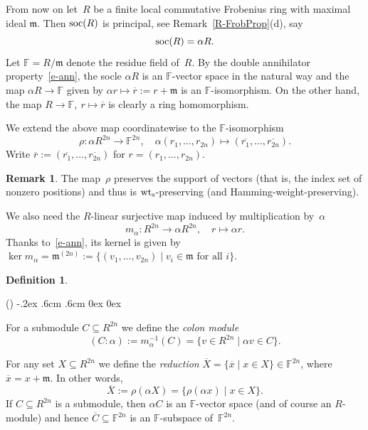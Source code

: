 \documentclass[11pt]{article}
\theoremstyle{definition}
\newtheorem{defi}[theo]{Definition}
\newtheorem{rem}[theo]{Remark}
\numberwithin{equation}{section}
\newcommand{\F}{{\mathbb F}}
\newcommand{\mm}{{\mathfrak m}}
\newcommand{\soc}{\mbox{\rm soc}}
\newcommand{\wts}{\mbox{${\rm wt}_{\rm s}$}}
\newcommand{\ov}[1]{\mbox{$\overline{#1}$}}
\newcounter{alp}
\newcounter{rom}
\newenvironment{alphalist}{\begin{list}{(\alph{alp})\hfill}{\usecounter{alp}
     \topsep-.2ex \labelwidth.6cm \leftmargin.6cm \labelsep0cm
     \rightmargin0cm \parsep0ex \itemsep0ex}}{\end{list}}
\begin{document}
From now on let~$R$ be a finite local commutative Frobenius ring with maximal ideal $\mm$.
Then $\soc(R)$ is principal, see Remark~\ref{R-FrobProp}(d), say
\begin{equation}\label{e-soc}
   \soc(R)=\alpha R.
\end{equation}
Let $\F=R/\mm$ denote the residue field of~$R$.
By the double annihilator property~\eqref{e-ann}, the socle $\alpha R$ is an $\F$-vector space in the natural way and the map
$\alpha R\longrightarrow\F$ given by $\alpha r\longmapsto \ov{r}:=r+\mm$ is an $\F$-isomorphism.
On the other hand, the map $R\longrightarrow\F,\ r\longmapsto\ov{r}$ is clearly a ring homomorphism.

We extend the above map coordinatewise to the $\F$-isomorphism
\begin{equation}\label{e-rho}
  \rho:\alpha R^{2n}\longrightarrow\F^{2n},\quad \alpha(r_1,\ldots,r_{2n})\longmapsto (\ov{r_1},\ldots,\ov{r_{2n}}).
\end{equation}
Write $\ov{r}:= (\ov{r_1},\ldots,\ov{r_{2n}})$ for $r=(r_1,\ldots,r_{2n})$.

\begin{rem}\label{R-rhopreserve}
The map~$\rho$  preserves the support of  vectors (that is, the index set of nonzero positions)
and thus is $\wts$-preserving (and Hamming-weight-preserving).
\end{rem}

We also need the $R$-linear surjective map induced by multiplication by~$\alpha$
\[
   m_{\alpha}: R^{2n}\longrightarrow\alpha R^{2n},\quad r\longmapsto \alpha r.
\]
Thanks to~\eqref{e-ann}, its kernel is given by $\ker m_{\alpha}=\mm^{(2n)}:=\{(v_1,\ldots,v_{2n})\mid v_i\in\mm\text{ for all }i\}$.


\begin{defi}\label{D-RedF}
\begin{alphalist}
\item For a submodule $C\subseteq R^{2n}$ we define the \emph{colon module}
        \[
               (C:\alpha):=m_\alpha^{-1}(C)=\{v\in R^{2n}\mid \alpha v\in C\}.
        \]
\item For any set $X\subseteq R^{2n}$ we define the \emph{reduction} $\ov{X}=\{\ov{x}\mid x\in X\}\in\F^{2n}$, where $\ov{x}=x+\mm$. In other words,
        \[
             \ov{X}:=\rho(\alpha X)=\{\rho(\alpha x)\mid x\in X\}.
        \]
        If  $C\subseteq R^{2n}$ is a submodule, then $\alpha C$ is an $\F$-vector space (and of course an $R$-module)
        and hence $\ov{C}\subseteq\F^{2n}$ is an $\F$-subspace of~$\F^{2n}$.
\end{alphalist}
\end{defi}
\end{document}
